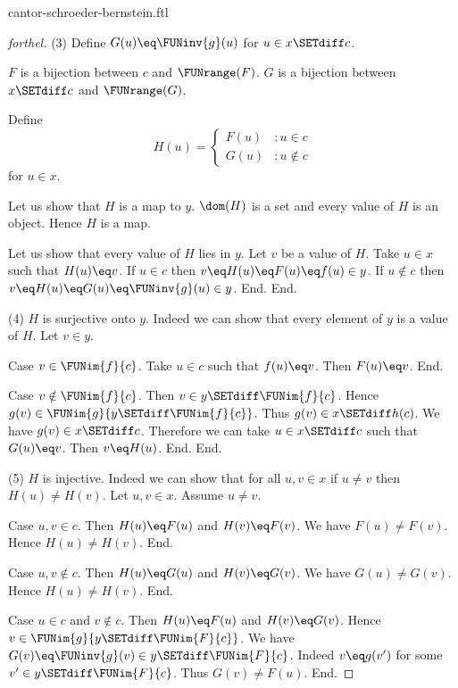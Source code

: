 \documentclass{naproche-library}
\begin{document}
\begin{smodule}[title=The Cantor-Schröder-Bernstein Theorem]{cantor-schroeder-bernstein.ftl}
\begin{proof}[forthel]
    (3) Define $G(u) \eq \FUNinv{g}(u)$ for $u \in x \SETdiff c$.

    $F$ is a bijection between $c$ and $\FUNrange(F)$.
    $G$ is a bijection between $x \SETdiff c$ and $\FUNrange(G)$.

    Define \[ H(u) =
      \begin{cases}
        F(u) & : u \in c \\
        G(u) & : u \notin c
      \end{cases} \]
    for $u \in x$.

    Let us show that $H$ is a map to $y$.
      $\dom(H)$ is a set and every value of $H$ is an object.
      Hence $H$ is a map.

      Let us show that every value of $H$ lies in $y$.
        Let $v$ be a value of $H$.
        Take $u \in x$ such that $H(u) \eq v$.
        If $u \in c$ then $v \eq H(u) \eq F(u) \eq f(u) \in y$.
        If $u \notin c$ then $v \eq H(u) \eq G(u) \eq \FUNinv{g}(u) \in y$.
      End.
    End.

    (4) $H$ is surjective onto $y$.
    Indeed we can show that every element of $y$ is a value of $H$.
      Let $v \in y$.

      Case $v \in \FUNim{f}{c}$.
        Take $u \in c$ such that $f(u) \eq v$.
        Then $F(u) \eq v$.
      End.

      Case $v \notin \FUNim{f}{c}$.
        Then $v \in y \SETdiff \FUNim{f}{c}$.
        Hence $g(v) \in \FUNim{g}{y \SETdiff \FUNim{f}{c}}$.
        Thus $g(v) \in x \SETdiff h(c)$.
        We have $g(v) \in x \SETdiff c$.
        Therefore we can take $u \in x \SETdiff c$ such that $G(u) \eq v$.
        Then $v \eq H(u)$.
      End.
    End.

    (5) $H$ is injective.
    Indeed we can show that for all $u, v \in x$ if $u \neq v$ then $H(u) \neq H(v)$.
      Let $u,v \in x$.
      Assume $u \neq v$.

      Case $u,v \in c$.
        Then $H(u) \eq F(u)$ and $H(v) \eq F(v)$.
        We have $F(u) \neq F(v)$.
        Hence $H(u) \neq H(v)$.
      End.

      Case $u,v \notin c$.
        Then $H(u) \eq G(u)$ and $H(v) \eq G(v)$.
        We have $G(u) \neq G(v)$.
        Hence $H(u) \neq H(v)$.
      End.

      Case $u \in c$ and $v \notin c$.
        Then $H(u) \eq F(u)$ and $H(v) \eq G(v)$.
        Hence $v \in \FUNim{g}{y \SETdiff \FUNim{F}{c}}$.
        We have $G(v) \eq \FUNinv{g}(v) \in y \SETdiff \FUNim{F}{c}$.
        Indeed $v \eq g(v')$ for some $v' \in y \SETdiff \FUNim{F}{c}$.
        Thus $G(v) \neq F(u)$.
      End.


\end{proof}
\end{smodule}
\end{document}
